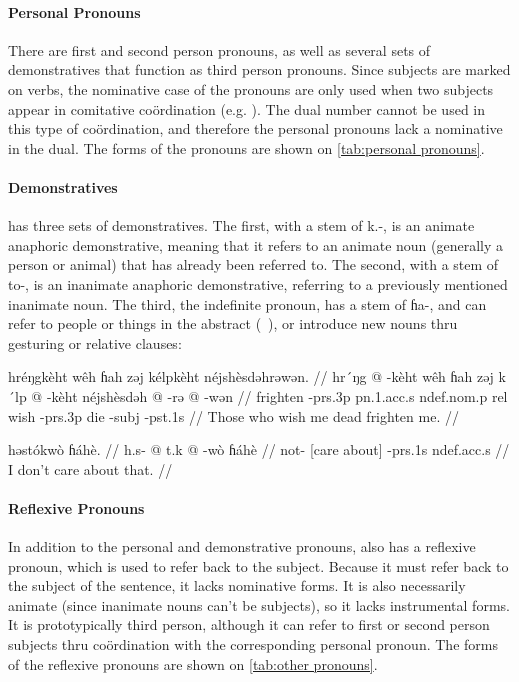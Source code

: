 \paragraph{Personal Pronouns} There are first and second person pronouns, as
well as several sets of demonstratives that function as third person pronouns.
Since subjects are marked on verbs, the nominative case of the pronouns are
only used when two subjects appear in comitative coördination (e.g. ). The dual number cannot be used in this type of coördination,
and therefore the personal pronouns lack a nominative in the dual. The forms of
the pronouns are shown on \cref{tab:personal pronouns}.

\paragraph{Demonstratives} \Langname{} has three sets of demonstratives. The
first, with a stem of {\ll k.-}, is an animate anaphoric demonstrative, meaning
that it refers to an animate noun (generally a person or animal) that has
already been referred to. The second, with a stem of {\ll to-}, is an
inanimate anaphoric demonstrative, referring to a previously mentioned
inanimate noun. The third, the indefinite pronoun, has a stem of {\ll ɦa-}, and
can refer to people or things in the abstract (\ie\ ), or introduce
new nouns thru gesturing or relative clauses:

\pex
\a
\begingl
\glpreamble hréŋgkèht wêh ɦah zəj kélpkèht néjshèsdəhrəwən. //
\gla hr´ŋg @ -kèht wêh ɦah zəj k´lp @ -kèht néjshèsdəh @ -rə @
-wən //
\glb frighten -{\sc prs}.3p {\sc pn}.1.{\sc acc}.s {\sc ndef}.{\sc nom}.p {\sc
    rel} wish -{\sc prs}.3p die -{\sc subj} -{\sc pst}.1s //
\glft Those who wish me dead frighten me. //
\endgl

\a
\begingl
    \glpreamble həstókwò ɦáhè. //
    \gla h.s- @ t.k @ -wò ɦáhè //
    \glb not- {[care about]} -{\sc prs}.1s {\sc ndef}.{\sc acc}.s //
    \glft I don't care about that. //
\endgl
\xe

\paragraph{Reflexive Pronouns} In addition to the personal and demonstrative
pronouns, \Langname{} also has a reflexive pronoun, which is used to
refer back to the subject. Because it must refer back to the subject of the
sentence, it lacks nominative forms. It is also necessarily animate (since
inanimate nouns can't be subjects), so it lacks instrumental forms. It is
prototypically third person, although it can refer to first or second person
subjects thru coördination with the corresponding personal pronoun. The forms
of the reflexive pronouns are shown on \cref{tab:other pronouns}.

